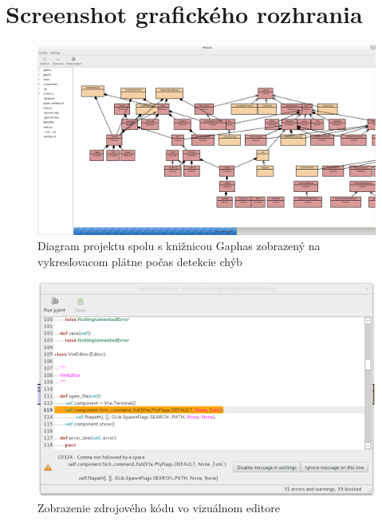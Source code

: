 \documentclass[11pt,oneside,final]{fithesis2}
\begin{document}
\appendix
\chapter{Screenshot grafického rozhrania}

	\begin{figure}[htb]
	 \centering
	 \includegraphics[width=\textwidth]{images/gpylint}
	 \caption{Diagram projektu spolu s knižnicou Gaphas zobrazený na vykresľovacom plátne počas detekcie chýb}
	\end{figure}

	\begin{figure}[htb]
	 \centering
	 \includegraphics[width=\textwidth]{images/code_window}
	 \caption{Zobrazenie zdrojového kódu vo vizuálnom editore}
	\end{figure}
			    
\end{document}
